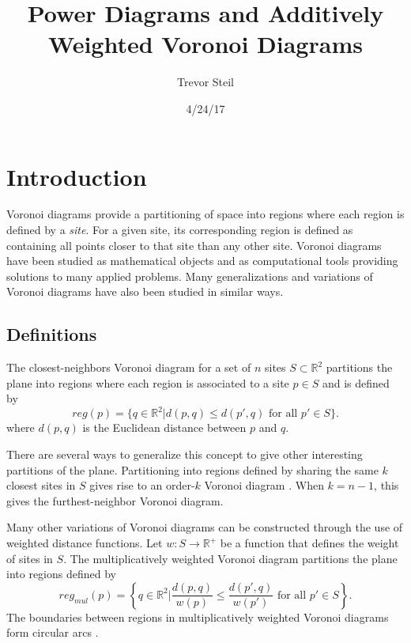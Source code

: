 \documentclass[a4paper, 11pt]{article}
\title{Power Diagrams and Additively Weighted Voronoi Diagrams }
\date{4/24/17}
\author{Trevor Steil}
\newcommand{\R}{\mathbb{R}}
\begin{document}
\maketitle

\section{Introduction}
Voronoi diagrams provide a partitioning of space into regions where each region is defined by a \textit{site}. For a given site, its corresponding
region is defined as containing all points closer to that site than any other site. Voronoi diagrams have been studied as mathematical objects and as
computational tools providing solutions to many applied problems. Many generalizations and variations of Voronoi diagrams have also been studied in
similar ways.

\subsection{Definitions}

The closest-neighbors Voronoi diagram for a set of $n$ sites $S \subset \R^2$ partitions the plane into regions where each region is associated to a
site $p \in S$ and is defined by
\begin{equation*}
  reg(p) = \{ q \in \R^2 | d(p,q) \leq d(p',q) \text{ for all } p' \in S \} .
\end{equation*}
where $d(p,q)$ is the Euclidean distance between $p$ and $q$.

There are several ways to generalize this concept to give other interesting partitions of the plane. Partitioning into regions defined by sharing the
same $k$ closest sites in $S$ gives rise to an order-$k$ Voronoi diagram \cite{aurenhammer_survey}. When $k=n-1$, this gives the furthest-neighbor
Voronoi diagram.

Many other variations of Voronoi diagrams can be constructed through the use of weighted distance functions. Let $w: S \to \R^+$ be a function that defines
the weight of sites in $S$. The multiplicatively weighted Voronoi diagram partitions the plane into regions defined by
\begin{equation*}
  reg_{mul}(p) = \left\{ q \in \R^2 | \frac{d(p,q)}{w(p)} \leq \frac{d(p',q)}{w(p')} \text{ for all } p' \in S \right\}.
\end{equation*}
The boundaries between regions in multiplicatively weighted Voronoi diagrams form circular arcs \cite{ash-bolker}.
\end{document}
